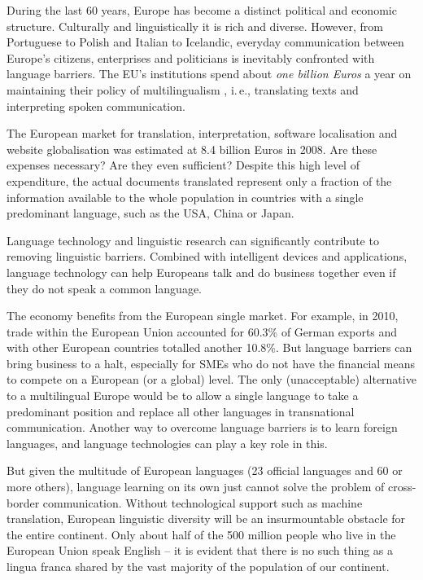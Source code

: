 \documentclass[10pt, plain]{../../metanetpaper}
\begin{document}
\begin{multicols}{2}
  During the last 60 years, Europe has become a distinct political and economic structure. Culturally and linguistically it is rich and diverse. However, from Portuguese to Polish and Italian to Icelandic, everyday communication between Europe's citizens, enterprises and politicians is inevitably confronted with language barriers. The EU's institutions spend about \emph{one billion Euros} a year on maintaining their policy of multilingualism \cite{EC7}, i.\,e., translating texts and interpreting spoken communication.

The European market for translation, interpretation, software localisation and website globalisation was estimated at 8.4 billion Euros in 2008. Are these expenses necessary? Are they even sufficient? Despite this high level of expenditure, the actual documents translated represent only a fraction of the information available to the whole population in countries with a single predominant language, such as the USA, China or Japan.

Language technology and linguistic research can significantly contribute to removing linguistic barriers. Combined with intelligent devices and applications, language technology can help Europeans talk and do business together even if they do not speak a common language.

The economy benefits from the European single market. For example, in 2010, trade within the European Union accounted for 60.3\% of German exports and with other European countries totalled another 10.8\%. But language barriers can bring business to a halt, especially for SMEs who do not have the financial means to compete on a European (or a global) level. The only (unacceptable) alternative to a multilingual Europe \cite{lre2011} would be to allow a single language to take a predominant position and replace all other languages in transnational communication. Another way to overcome language barriers is to learn foreign languages, and language technologies can play a key role in this. 

But given the multitude of European languages (23 official languages and 60 or more others), language learning on its own just cannot solve the problem of cross-border communication. Without technological support such as machine translation, European linguistic diversity will be an insurmountable obstacle for the entire continent. Only about half of the 500 million people who live in the European Union speak English -- it is evident that there is no such thing as a lingua franca shared by the vast majority of the population of our continent.


\end{multicols}
\end{document}

